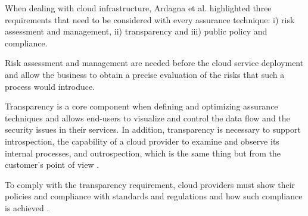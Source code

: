 When dealing with cloud infrastructure, Ardagna et al. \cite{article} highlighted three requirements that need to be considered with every assurance technique: i) risk assessment and management, ii) transparency and iii) public policy and compliance.

Risk assessment and management are needed before the cloud service deployment and allow the business to obtain a precise evaluation of the risks that such a process would introduce.

Transparency is a core component when defining and optimizing assurance techniques and allows end-users to visualize and control the data flow and the security issues in their services. In addition, transparency is necessary to support introspection, the capability of a cloud provider to examine and observe its internal processes, and outrospection, which is the same thing but from the customer's point of view \cite{ardagna2014management}.

To comply with the transparency requirement, cloud providers must show their policies and compliance with standards and regulations and how such compliance is achieved \cite{macneil2006comply}.

